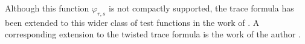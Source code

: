 \documentclass[11pt]{amsart}
\theoremstyle{remark}
\begin{document}
Although this function $\varphi_{r, s}$ is not compactly supported, the trace formula has been extended to this wider class of test functions in the work of \cite{FL16, FLM}. A corresponding extension to the twisted trace formula is the work of the author \cite{Par17}. 









\end{document}
